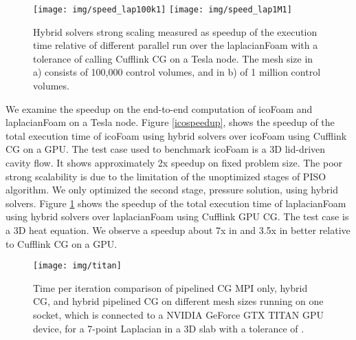 \documentclass[3p,times]{elsarticle}
\begin{document}
\begin{figure}[h!]
\begin{center}
\emph{} \texttt{[image: img/speed\_lap100k1]}
\emph{} \texttt{[image: img/speed\_lap1M1]}
\caption{Hybrid solvers strong scaling measured as speedup of the execution time relative of different parallel run over the laplacianFoam with a tolerance of  calling Cufflink CG on a Tesla node. The mesh size in a) consists of 100,000 control volumes, and in b) of 1 million control volumes.}
\label{lapspeedup}
\end{center}
\end{figure}  

We examine the speedup on the end-to-end computation of icoFoam and laplacianFoam on a Tesla node. Figure \ref{icospeedup}, shows the speedup of the total execution time of icoFoam using hybrid solvers over icoFoam using Cufflink CG on a GPU. The test case used to benchmark icoFoam is a 3D lid-driven cavity flow. It shows approximately 2x speedup on fixed problem size. The poor strong scalability is due to the limitation of the unoptimized stages of PISO algorithm. We only optimized the second stage, pressure solution, using hybrid solvers. Figure \ref{lapspeedup} shows the speedup of the total execution time of laplacianFoam using hybrid solvers over laplacianFoam using Cufflink GPU CG. The test case is a 3D heat equation. We observe a speedup about 7x in \emph{} and 3.5x in \emph{} better relative to Cufflink CG on a GPU. \\



\begin{figure}[h]
\begin{center}
\texttt{[image: img/titan]}
\caption{Time per iteration comparison of pipelined CG MPI only, hybrid CG, and hybrid pipelined CG on different mesh sizes running on one socket, which is connected to a NVIDIA GeForce GTX TITAN GPU device, for a 7-point Laplacian in a 3D slab with a tolerance of .}
\label{titan_com}
\end{center}
\end{figure} 
\end{document}

